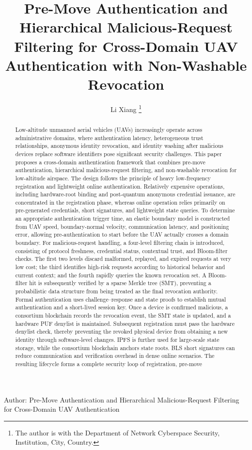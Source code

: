 \documentclass[lettersize,journal]{IEEEtran}
\begin{document}
	
	\title{Pre-Move Authentication and Hierarchical Malicious-Request Filtering for Cross-Domain UAV Authentication with Non-Washable Revocation}
	
	\author{Li Xiang%
		\thanks{The author is with the Department of Network Cyberspace Security, Institution, City, Country.}}
	
	{Author: Pre-Move Authentication and Hierarchical Malicious-Request Filtering for Cross-Domain UAV Authentication}
	
	\maketitle
	
	\begin{abstract}
		Low-altitude unmanned aerial vehicles (UAVs) increasingly operate across administrative domains, where authentication latency, heterogeneous trust relationships, anonymous identity revocation, and identity washing after malicious devices replace software identifiers pose significant security challenges. This paper proposes a cross-domain authentication framework that combines pre-move authentication, hierarchical malicious-request filtering, and non-washable revocation for low-altitude airspace. The design follows the principle of heavy low-frequency registration and lightweight online authentication. Relatively expensive operations, including hardware-root binding and post-quantum anonymous credential issuance, are concentrated in the registration phase, whereas online operation relies primarily on pre-generated credentials, short signatures, and lightweight state queries. To determine an appropriate authentication trigger time, an elastic boundary model is constructed from UAV speed, boundary-normal velocity, communication latency, and positioning error, allowing pre-authentication to start before the UAV actually crosses a domain boundary. For malicious-request handling, a four-level filtering chain is introduced, consisting of protocol freshness, credential status, contextual trust, and Bloom-filter checks. The first two levels discard malformed, replayed, and expired requests at very low cost; the third identifies high-risk requests according to historical behavior and current context; and the fourth rapidly queries the known revocation set. A Bloom-filter hit is subsequently verified by a sparse Merkle tree (SMT), preventing a probabilistic data structure from being treated as the final revocation authority. Formal authentication uses challenge--response and state proofs to establish mutual authentication and a short-lived session key. Once a device is confirmed malicious, a consortium blockchain records the revocation event, the SMT state is updated, and a hardware PUF denylist is maintained. Subsequent registration must pass the hardware denylist check, thereby preventing the revoked physical device from obtaining a new identity through software-level changes. IPFS is further used for large-scale state storage, while the consortium blockchain anchors state roots. BLS short signatures can reduce communication and verification overhead in dense online scenarios. The resulting lifecycle forms a complete security loop of registration, pre-move 
\end{abstract}
\end{document}
